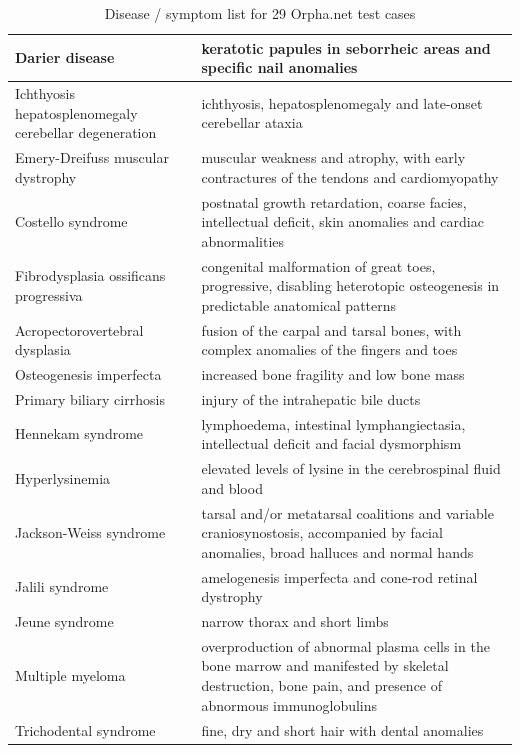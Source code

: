 \begin{table}[H]
\begin{scriptsize}
\begin{tabular}{| p{6cm} | p{6.5cm} |}
      \hline
      Darier disease & keratotic papules in seborrheic areas and specific nail anomalies \\
      \hline
      Ichthyosis hepatosplenomegaly cerebellar degeneration & ichthyosis, hepatosplenomegaly and late-onset cerebellar ataxia \\
      \hline
      Emery-Dreifuss muscular dystrophy & muscular weakness and atrophy, with early contractures of the tendons and cardiomyopathy \\
      \hline
      Costello syndrome & postnatal growth retardation, coarse facies, intellectual deficit, skin anomalies and cardiac abnormalities \\
      \hline
      Fibrodysplasia ossificans progressiva & congenital malformation of great toes, progressive, disabling heterotopic osteogenesis in predictable anatomical patterns \\
      \hline
      Acropectorovertebral dysplasia & fusion of the carpal and tarsal bones, with complex anomalies of the fingers and toes \\
      \hline
      Osteogenesis imperfecta & increased bone fragility and low bone mass \\
      \hline
      Primary biliary cirrhosis & injury of the intrahepatic bile ducts \\
      \hline
      Hennekam syndrome & lymphoedema, intestinal lymphangiectasia, intellectual deficit and facial dysmorphism \\
      \hline
      Hyperlysinemia & elevated levels of lysine in the cerebrospinal fluid and blood \\
      \hline
      Jackson-Weiss syndrome & tarsal and/or metatarsal coalitions and variable craniosynostosis, accompanied by facial anomalies, broad halluces and normal hands \\
      \hline
      Jalili syndrome & amelogenesis imperfecta and cone-rod retinal dystrophy \\
      \hline
      Jeune syndrome & narrow thorax and short limbs \\
      \hline
      Multiple myeloma & overproduction of abnormal plasma cells in the bone marrow and manifested by skeletal destruction, bone pain, and presence of abnormous immunoglobulins \\
      \hline
      Trichodental syndrome & fine, dry and short hair with dental anomalies \\
      \hline
    \end{tabular}
  \end{scriptsize}
  \caption{Disease / symptom list for 29 Orpha.net test cases}
  \label{OrphanetCases1}
\end{table}

